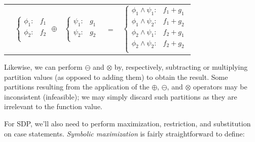 \documentclass[letterpaper]{article}
\begin{document}
{\footnotesize 
\begin{center}
\begin{tabular}{r c c c l}
&
\hspace{-6mm} 
  $\begin{cases}
    \phi_1: & f_1 \\ 
    \phi_2: & f_2 \\ 
  \end{cases}$
$\oplus$
&
\hspace{-4mm}
  $\begin{cases}
    \psi_1: & g_1 \\ 
    \psi_2: & g_2 \\ 
  \end{cases}$
&
\hspace{-2mm} 
$ = $
&
\hspace{-2mm}
  $\begin{cases}
  \phi_1 \wedge \psi_1: & f_1 + g_1 \\ 
  \phi_1 \wedge \psi_2: & f_1 + g_2 \\ 
  \phi_2 \wedge \psi_1: & f_2 + g_1 \\ 
  \phi_2 \wedge \psi_2: & f_2 + g_2 \\ 
  \end{cases}$
\end{tabular}
\end{center}
}
\normalsize

Likewise, we can perform $\ominus$ and $\otimes$ by,
respectively, subtracting or multiplying partition values (as opposed
to adding them) to obtain the result.  Some partitions resulting from
the application of the $\oplus$, $\ominus$, and $\otimes$ operators
may be inconsistent (infeasible); we may simply discard such 
partitions as they are irrelevant to the function value.

For SDP, we'll also need to perform maximization, restriction,
and substitution on case statements.  
\emph{Symbolic maximization} is fairly straightforward
to define:
\vspace{-5mm}
\end{document}
